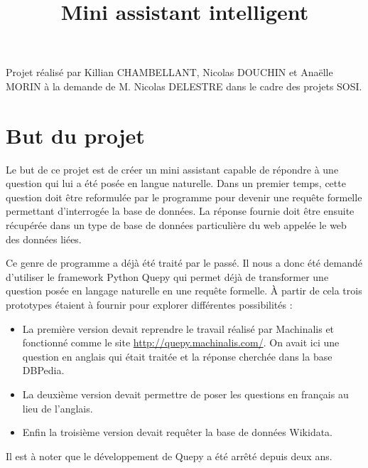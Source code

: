 \documentclass[11pt,a4paper]{article}
\title{Mini assistant intelligent}
\author{}
\begin{document}

Projet réalisé par Killian CHAMBELLANT, Nicolas DOUCHIN et Anaëlle MORIN à la demande de M. Nicolas DELESTRE dans le cadre des projets SOSI.


\section*{But du projet}\par
Le but de ce projet est de créer un mini assistant capable de répondre à une question qui lui a été posée en langue naturelle. 
Dans un premier temps, cette question doit être reformulée par le programme pour devenir une requête formelle permettant d'interrogée la base de données. La réponse fournie doit être ensuite récupérée dans un type de base de données particulière du web appelée le web des données liées.\par 
Ce genre de programme a déjà été traité par le passé. Il nous a donc été demandé d'utiliser le framework Python Quepy qui permet déjà de transformer une question posée en langage naturelle en une requête formelle. À partir de cela trois prototypes étaient à fournir pour explorer différentes possibilités : \par
\begin{itemize}
\item La première version devait reprendre le travail réalisé par Machinalis et fonctionné comme le site \url{http://quepy.machinalis.com/}. On avait ici une question en anglais qui était traitée et la réponse cherchée dans la base DBPedia.
\item La deuxième version devait permettre de poser les questions en français au lieu de l'anglais.
\item Enfin la troisième version devait requêter la base de données Wikidata.
\end{itemize}\par
Il est à noter que le développement de Quepy a été arrêté depuis deux ans.
\end{document}
